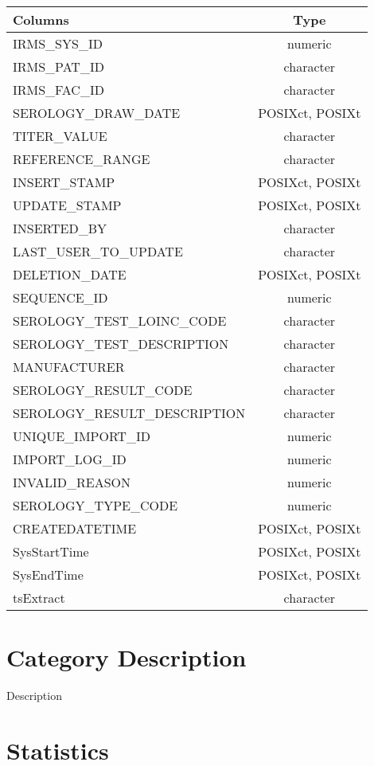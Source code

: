 \documentclass[
  letterpaper,
  DIV=11,
  numbers=noendperiod]{scrreprt}
\begin{document}
\begin{longtable}{lc}
\toprule
Columns & Type \\ 
\midrule
IRMS\_SYS\_ID & numeric \\ 
IRMS\_PAT\_ID & character \\ 
IRMS\_FAC\_ID & character \\ 
SEROLOGY\_DRAW\_DATE & POSIXct, POSIXt \\ 
TITER\_VALUE & character \\ 
REFERENCE\_RANGE & character \\ 
INSERT\_STAMP & POSIXct, POSIXt \\ 
UPDATE\_STAMP & POSIXct, POSIXt \\ 
INSERTED\_BY & character \\ 
LAST\_USER\_TO\_UPDATE & character \\ 
DELETION\_DATE & POSIXct, POSIXt \\ 
SEQUENCE\_ID & numeric \\ 
SEROLOGY\_TEST\_LOINC\_CODE & character \\ 
SEROLOGY\_TEST\_DESCRIPTION & character \\ 
MANUFACTURER & character \\ 
SEROLOGY\_RESULT\_CODE & character \\ 
SEROLOGY\_RESULT\_DESCRIPTION & character \\ 
UNIQUE\_IMPORT\_ID & numeric \\ 
IMPORT\_LOG\_ID & numeric \\ 
INVALID\_REASON & numeric \\ 
SEROLOGY\_TYPE\_CODE & numeric \\ 
CREATEDATETIME & POSIXct, POSIXt \\ 
SysStartTime & POSIXct, POSIXt \\ 
SysEndTime & POSIXct, POSIXt \\ 
tsExtract & character \\ 
\bottomrule
\end{longtable}

\hypertarget{category-description-37}{%
\section*{Category Description}\label{category-description-37}}

Description

\hypertarget{statistics-37}{%
\section*{Statistics}\label{statistics-37}}
\end{document}
